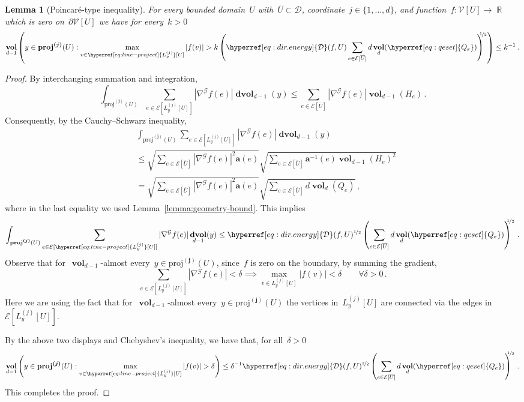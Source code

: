 \documentclass[12pt]{amsart}
\numberwithin{equation}{section}
\DeclareMathOperator{\R}{\mathbb{R}}
\newtheorem{lemma}[theorem]{Lemma}
\newcommand{\V}{\mathcal{V}}
\newcommand{\E}{\mathcal{E}}
\newcommand{\projj}{\boldsymbol{\mathrm{proj}^{(j)}}}
\newcommand{\cond}{\hyperref[eq:geometric-laplacian]{\mathbf{a}}}
\newcommand{\D}{\hyperref[eq:dir.energy]{\mathcal{D}}}
\newcommand{\Qe}{\hyperref[eq:qeset]{Q_e}}
\newcommand{\Lyj}{\hyperref[eq:line-project]{L_y^{(j)}}}
\DeclareMathOperator{\vol}{\mathbf{vol}}
\DeclareMathOperator{\dvol}{\mathbf{d vol}}
\begin{document}
\begin{lemma}[Poincar\'e-type inequality]
	\label{lemma:ptype-inequality}
	For every bounded domain~$U$ with~$\overline{U} \subset \mathcal{D}$, coordinate~$j \in \{1, \ldots, d\}$, and function~$f: \V[U] \to \R$ which is zero on~$\partial \V[U]$ we have for every~$k > 0$
	\[
	\vol_{d-1}\left( y \in \projj(U): \max_{v \in \Lyj[U]} |f(v)| > k    \left( \D(f,U) \sum_{e \in \E[\overline{U}]} d   \vol_{d}(\Qe) \right)^{\! \!  \! \!\nicefrac12} \right) \leq k^{-1}  \, . 
	\]
\end{lemma}
\begin{proof}

	
	By interchanging summation and integration, 
	\[
		\int_{\projj(U)} \sum_{e \in \E[\Lyj[U]]} |\nabla^{\mathcal{G}} f(e)| \dvol_{d-1}(y)
		 \leq \sum_{e \in \E[\overline{U}]} |\nabla^{\mathcal{G}} f(e)| \vol_{d-1}(H_e)  \, . 
	\]
	Consequently, by the Cauchy–Schwarz inequality, 
	\begin{align*}
		&\int_{\projj(U)} \sum_{e \in \E[\Lyj[U]]} |\nabla^{\mathcal{G}} f(e)| \dvol_{d-1}(y) \\
		&\leq  \sqrt{\sum_{e \in \E[\overline{U}]} |\nabla^{\mathcal{G}} f(e)|^2 \cond(e)} \sqrt{ \sum_{e \in \E[\overline{U}]}    \cond^{-1}(e) \vol_{d-1}(H_e)^2	} \\
		&=  \sqrt{\sum_{e \in \E[\overline{U}]}  |\nabla^{\mathcal{G}} f(e)|^2 \cond(e)} \sqrt{ \sum_{e \in \E[\overline{U}]}   d \vol_{d}(\Qe)	} \, , 
	\end{align*}
	where in the last equality we used Lemma~\ref{lemma:geometry-bound}. This implies
	\begin{equation}
		\label{eq:bound-on-sums-of-gradients}
		\int_{\projj(U)} \sum_{e \in \E[\Lyj[U]]} |\nabla^{\mathcal{G}} f(e)| \dvol_{d-1}(y) \leq   \D(f,U)^{\nicefrac12}   \left( \sum_{e \in \E[\overline{U}]} d   \vol_{d}(\Qe)  \right)^{\! \!  \! \!\nicefrac12} \, . 
	\end{equation}
	Observe that for~$\vol_{d-1}$-almost every~$y \in \projj(U)$, since~$f$ is zero on the boundary, by summing the gradient,
	\[
	\sum_{e \in \E[\Lyj[U]]} |\nabla^{\mathcal{G}} f(e)| < \delta \implies \max_{v \in \Lyj[U]} |f(v)| < \delta  \qquad \forall \delta > 0 \, . 
	\]
	Here we are using the fact that for~$\vol_{d-1}$-almost every~$y \in \projj(U)$ the vertices in~$\Lyj[U]$ are connected via the edges in $\E[\Lyj[U]]$.
	
	By the above two displays and Chebyshev's inequality, we have that, for all~$\delta> 0$
	\[
	\vol_{d-1} \left( y \in \projj(U): \max_{v \in \Lyj[U]} |f(v)| > \delta \right) \leq \delta^{-1}  \D(f,U)^{\nicefrac12}   \left( \sum_{e \in \E[\overline{U}]} d   \vol_{d}(\Qe)  \right)^{\! \!  \! \!\nicefrac12}  \, . 
	\]
	This completes the proof. 
\end{proof}
\end{document}

